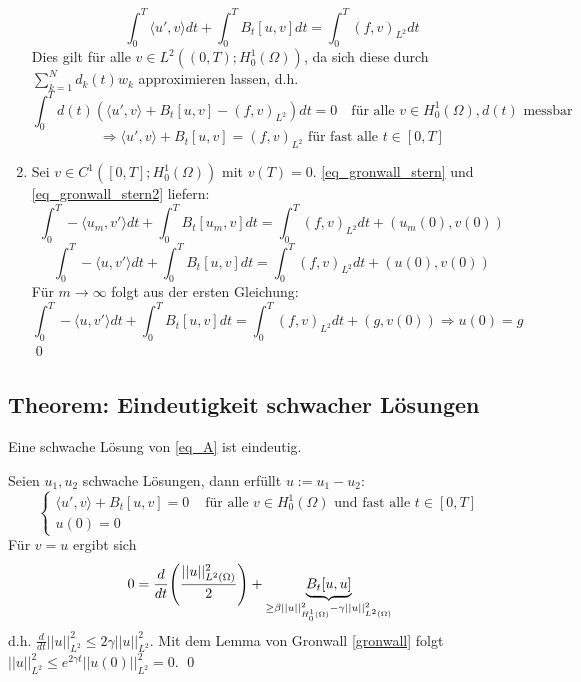 \begin{enumerate}[1)]
\begin{equation}
			\int_{0}^{T} \langle u',v \rangle dt + \int_{0}^{T} B_t [u,v] dt = \int_{0}^{T} (f,v)_{L^2} dt \label{eq_gronwall_stern2}
		\end{equation}
		Dies gilt für alle $v \in L^2((0,T);H_0^1(\Omega))$, da sich diese durch $\sum_{k=1}^{N} d_k(t) w_k$ approximieren lassen, d.h.
		\[ \int_{0}^{T} d(t) (\langle u',v \rangle + B_t[u,v] - (f,v)_{L^2})dt = 0 \quad \text{für alle } v \in H_0^1(\Omega), d(t) \text{ messbar} \]
		\[ \Rightarrow \langle u',v \rangle + B_t[u,v] = (f,v)_{L^2} \text{ für fast alle } t \in [0,T] \]
		\item Sei $v \in C^1([0,T];H_0^1(\Omega))$ mit $v(T) = 0$. \eqref{eq_gronwall_stern} und \eqref{eq_gronwall_stern2} liefern:
		\[ \int_{0}^{T} -\langle u_m, v' \rangle dt + \int_{0}^{T} B_t [u_m,v] dt = \int_{0}^{T} (f,v)_{L^2} dt + (u_m(0),v(0)) \]
		\[ \int_{0}^{T} -\langle u, v' \rangle dt + \int_{0}^{T} B_t [u,v] dt = \int_{0}^{T} (f,v)_{L^2} dt + (u(0),v(0)) \]
		Für $m \rightarrow \infty$ folgt aus der ersten Gleichung:
		\[ \int_{0}^{T} -\langle u, v' \rangle dt + \int_{0}^{T} B_t [u,v] dt = \int_{0}^{T} (f,v)_{L^2} dt + (g,v(0)) \Rightarrow u(0) = g\] \qed
	\end{enumerate}

\subsection{Theorem: Eindeutigkeit schwacher Lösungen}
	Eine schwache Lösung von \eqref{eq_A} ist eindeutig.
	
	Seien $u_1, u_2$ schwache Lösungen, dann erfüllt $u := u_1 - u_2$:
	\[ \begin{cases}
		\langle u',v \rangle + B_t[u,v] = 0 & \text{ für alle } v \in H_0^1(\Omega) \text{ und fast alle } t \in [0,T] \\
		u(0)=0 \end{cases} \]
	Für $v = u$ ergibt sich
	\[ 0 = \frac{d}{dt} \enbrace*{\frac{||u||_{L^2(\Omega)}^2}{2}} + \underbrace{B_t[u,u]}_{\geq \beta ||u||_{H_0^1(\Omega)}^2 - \gamma ||u||_{L^2(\Omega)}^2} \]
	d.h. $\frac{d}{dt} ||u||_{L^2}^2 \leq 2\gamma ||u||_{L^2}^2$. Mit dem Lemma von Gronwall \ref{gronwall} folgt $||u||_{L^2}^2 \leq e^{2 \gamma t} ||u(0)||_{L^2}^2 = 0$. \qed
\newpage
